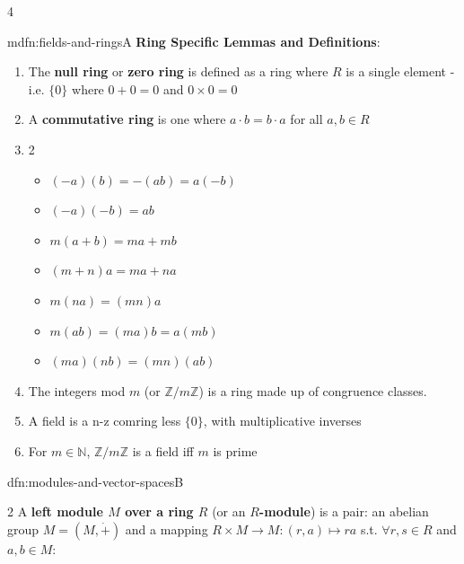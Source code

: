 \documentclass[landscape, 8pt]{extarticle}
\begin{document}
\begin{multicols*}{4}
\begin{mdfn}{mdfn:fields-and-rings}{A}
			\textbf{Ring Specific Lemmas and Definitions}:
			\begin{enumerate}
				
				\setlength\itemsep{0em}
				\item The \textbf{null ring} or \textbf{zero ring} is defined as a ring where $R$ is a single element - i.e. $\{0\}$ where $0 + 0 = 0$ and $0 \times 0 = 0$
				\item A \textbf{commutative ring} is one where $a \cdot b = b \cdot a$ for all $a,b\in R$
				
				\vspace{-4.5ex}
				
				\item\begin{multicols}{2}
					\begin{itemize}[leftmargin=*]
						\item $(-a)(b) = -(ab) = a(-b)$
						\item $(-a)(-b) = ab$
						\item $m(a + b) = ma + mb$
						\item $(m + n)a = ma + na$
						\item $m(na) = (mn)a$
						\item $m(ab) = (ma)b = a(mb)$
						\item $(ma)(nb) = (mn)(ab)$
					\end{itemize}
				\end{multicols}
				
				\vspace*{-5ex}
				
				\item The integers mod $m$ (or $\mathbb{Z}/m\mathbb{Z}$) is a ring made up of congruence classes.
				\item A field is a n-z comring less $\{0\}$, with multiplicative inverses
				\item For $m \in \mathbb{N}$, $\mathbb{Z}/m\mathbb{Z}$ is a field iff $m$ is prime
			\end{enumerate}
		\end{mdfn}
		
		
		\begin{mdfn}{dfn:modules-and-vector-spaces}{B}
			
		{
			\setlength{\columnseprule}{0.5pt}
			\begin{multicols}{2}
					A \textbf{left module $M$ over a ring $R$} (or an \textbf{$R$-module}) is a pair: an abelian group $M = (M, \dot{+})$ and a mapping $R \times M \to M : (r, a)\mapsto ra$ s.t. $\forall r, s\in R$ and $a,b\in M$:
				

\end{multicols}}
\end{mdfn}
\end{multicols*}
\end{document}
